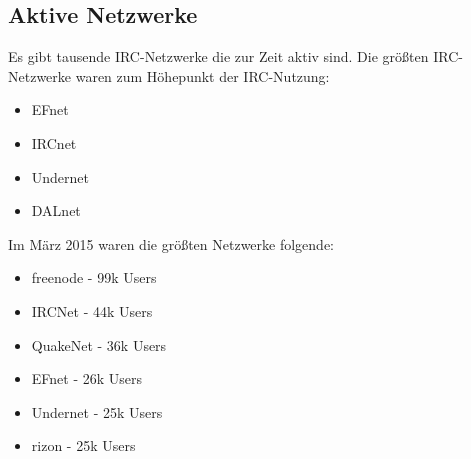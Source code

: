 \subsection{Aktive Netzwerke}
Es gibt tausende IRC-Netzwerke die zur Zeit aktiv sind. Die größten IRC-Netzwerke waren zum Höhepunkt der IRC-Nutzung:
\begin{itemize}
\item EFnet
\item IRCnet
\item Undernet
\item DALnet
\end{itemize}
Im März 2015 waren die größten Netzwerke folgende:
\begin{itemize}
\item freenode - 99k Users
\item IRCNet - 44k Users
\item QuakeNet - 36k Users
\item EFnet - 26k Users
\item Undernet - 25k Users
\item rizon - 25k Users
\end{itemize}

